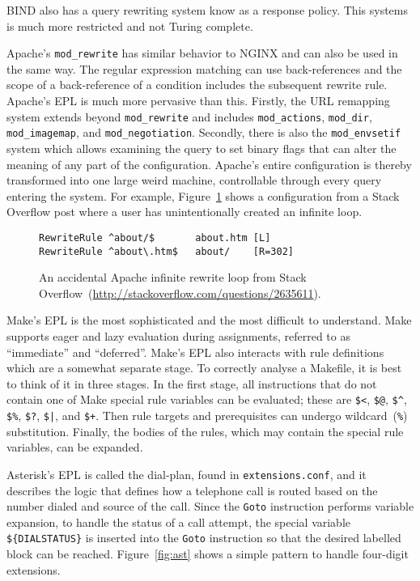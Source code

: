 \documentclass[letterpaper,twocolumn,10pt]{article}
\begin{document}
BIND also has a query rewriting system know as a response policy. This systems is much more restricted and not Turing complete.

Apache's \verb!mod_rewrite! has similar behavior to NGINX and can also be used in the same way. The regular expression matching can use back-references and the scope of a back-reference of a condition includes the subsequent rewrite rule. Apache's EPL is much more pervasive than this. Firstly, the URL remapping system extends beyond \verb!mod_rewrite! and includes \verb!mod_actions!, \verb!mod_dir!, \verb!mod_imagemap!, and \verb!mod_negotiation!. Secondly, there is also the \verb!mod_envsetif! system which allows examining the query to set binary flags that can alter the meaning of any part of the configuration. Apache's entire configuration is thereby transformed into one large weird machine, controllable through every query entering the system. For example, Figure~\ref{fig:rwloop} shows a configuration from a Stack Overflow post where a user has unintentionally created an infinite loop.

\begin{figure}
\caption{\label{fig:rwloop}An accidental Apache infinite rewrite loop from Stack Overflow~(\url{http://stackoverflow.com/questions/2635611}).}
\scriptsize
\begin{verbatim}
RewriteRule ^about/$       about.htm [L]
RewriteRule ^about\.htm$   about/    [R=302]
\end{verbatim}
\end{figure}


Make's EPL is the most sophisticated and the most difficult to understand. Make supports eager and lazy evaluation during assignments, referred to as ``immediate'' and ``deferred''. Make's EPL also interacts with rule definitions which are a somewhat separate stage. To correctly analyse a Makefile, it is best to think of it in three stages. In the first stage, all instructions that do not contain one of Make special rule variables can be evaluated; these are \texttt{\$<}, \texttt{\$@}, \texttt{\$\^{}}, \texttt{\$\%}, \texttt{\$?}, \texttt{\$|}, and \texttt{\$+}. Then rule targets and prerequisites can undergo wildcard~(\texttt{\%}) substitution. Finally, the bodies of the rules, which may contain the special rule variables, can be expanded.

Asterisk's EPL is called the dial-plan, found in \texttt{extensions.conf}, and it describes the logic that defines how a telephone call is routed based on the number dialed and source of the call. Since the \texttt{Goto} instruction performs variable expansion, to handle the status of a call attempt, the special variable \texttt{\$\{DIALSTATUS\}} is inserted into the \texttt{Goto} instruction so that the desired labelled block can be reached. Figure~\ref{fig:ast} shows a simple pattern to handle four-digit extensions.
\end{document}
